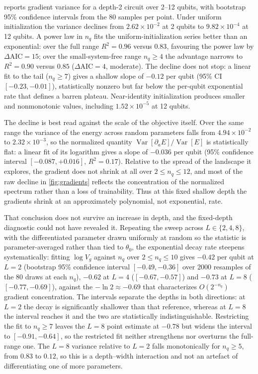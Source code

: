 \documentclass{ieeeaccess}
\newcommand{\Var}{\operatorname{Var}}
\begin{document}
 reports gradient variance for a depth-2 circuit over 2--12 qubits, with bootstrap 95\% confidence intervals from the 80 samples per point. Under uniform initialization the variance declines from $2.62\times10^{-2}$ at 2 qubits to $9.82\times10^{-4}$ at 12 qubits. A power law in $n_q$ fits the uniform-initialization series better than an exponential: over the full range $R^2=0.96$ versus $0.83$, favouring the power law by $\Delta\mathrm{AIC}=15$; over the small-system-free range $n_q\ge4$ the advantage narrows to $R^2=0.90$ versus $0.85$ ($\Delta\mathrm{AIC}=4$, moderate). The decline does not stop: a linear fit to the tail ($n_q\ge7$) gives a shallow slope of $-0.12$ per qubit (95\% CI $[-0.23,-0.01]$), statistically nonzero but far below the per-qubit exponential rate that defines a barren plateau. Near-identity initialization produces smaller and nonmonotonic values, including $1.52\times10^{-5}$ at 12 qubits.

The decline is best read against the scale of the objective itself. Over the same range the variance of the energy across random parameters falls from $4.94\times10^{-2}$ to $2.32\times10^{-3}$, so the normalized quantity $\Var[\partial_a E]/\Var[E]$ is statistically flat: a linear fit of its logarithm gives a slope of $-0.036$ per qubit (95\% confidence interval $[-0.087,+0.016]$, $R^2=0.17$). Relative to the spread of the landscape it explores, the gradient does not shrink at all over $2\le n_q\le12$, and most of the raw decline in \cref{fig:gradients} reflects the concentration of the normalized spectrum rather than a loss of trainability. Thus at this fixed shallow depth the gradients shrink at an approximately polynomial, not exponential, rate.

That conclusion does not survive an increase in depth, and the fixed-depth diagnostic could not have revealed it. Repeating the sweep across $L\in\{2,4,8\}$, with the differentiated parameter drawn uniformly at random so the statistic is parameter-averaged rather than tied to $\theta_0$, the exponential decay rate steepens systematically: fitting $\log V_g$ against $n_q$ over $2\le n_q\le10$ gives $-0.42$ per qubit at $L=2$ (bootstrap 95\% confidence interval $[-0.49,-0.36]$ over 2000 resamples of the 80 draws at each $n_q$), $-0.62$ at $L=4$ ($[-0.67,-0.57]$) and $-0.73$ at $L=8$ ($[-0.77,-0.69]$), against the $-\ln 2\approx-0.69$ that characterizes $O(2^{-n_q})$ gradient concentration. The intervals separate the depths in both directions: at $L=2$ the decay is significantly shallower than that reference, whereas at $L=8$ the interval reaches it and the two are statistically indistinguishable. Restricting the fit to $n_q\ge7$ leaves the $L=8$ point estimate at $-0.78$ but widens the interval to $[-0.91,-0.64]$, so the restricted fit neither strengthens nor overturns the full-range one. The $L=8$ variance relative to $L=2$ falls monotonically for $n_q\ge5$, from $0.83$ to $0.12$, so this is a depth--width interaction and not an artefact of differentiating one of more parameters.
\end{document}
